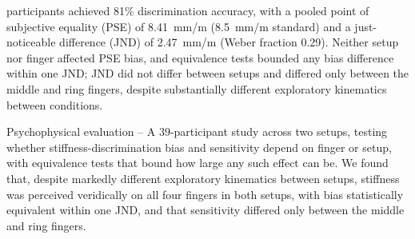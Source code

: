 
participants achieved 81\% discrimination accuracy, with a pooled point of subjective equality (PSE) of 8.41~mm/m (8.5~mm/m standard) and a just-noticeable difference (JND) of 2.47~mm/m (Weber fraction 0.29).
Neither setup nor finger affected PSE bias, and equivalence tests bounded any bias difference within one JND; JND did not differ between setups and differed only between the middle and ring fingers, despite substantially different exploratory kinematics between conditions.

\item Psychophysical evaluation -- A 39-participant study across two setups, testing whether stiffness-discrimination bias and sensitivity depend on finger or setup, with equivalence tests that bound how large any such effect can be.
\noindent We found that, despite markedly different exploratory kinematics between setups, stiffness was perceived veridically on all four fingers in both setups, with bias statistically equivalent within one JND, and that sensitivity differed only between the middle and ring fingers.

